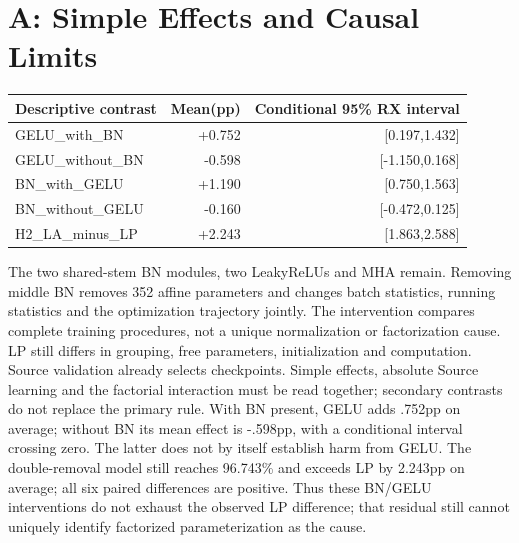 \documentclass[10pt]{article}
\begin{document}
\section{A: Simple Effects and Causal Limits}
\begin{center}\small\begin{tabular}{lrr}\toprule
Descriptive contrast&Mean(pp)&Conditional 95\% RX interval\\\midrule
GELU\_with\_BN&+0.752&[0.197,1.432]\\
GELU\_without\_BN&-0.598&[-1.150,0.168]\\
BN\_with\_GELU&+1.190&[0.750,1.563]\\
BN\_without\_GELU&-0.160&[-0.472,0.125]\\
H2\_LA\_minus\_LP&+2.243&[1.863,2.588]\\
\bottomrule\end{tabular}\end{center}
The two shared-stem BN modules, two LeakyReLUs and MHA remain. Removing middle BN removes 352 affine parameters and changes batch statistics, running statistics and the optimization trajectory jointly. The intervention compares complete training procedures, not a unique normalization or factorization cause. LP still differs in grouping, free parameters, initialization and computation. Source validation already selects checkpoints. Simple effects, absolute Source learning and the factorial interaction must be read together; secondary contrasts do not replace the primary rule.
With BN present, GELU adds .752pp on average; without BN its mean effect is -.598pp, with a conditional interval crossing zero. The latter does not by itself establish harm from GELU. The double-removal model still reaches 96.743\% and exceeds LP by 2.243pp on average; all six paired differences are positive. Thus these BN/GELU interventions do not exhaust the observed LP difference; that residual still cannot uniquely identify factorized parameterization as the cause.
\clearpage
\end{document}
